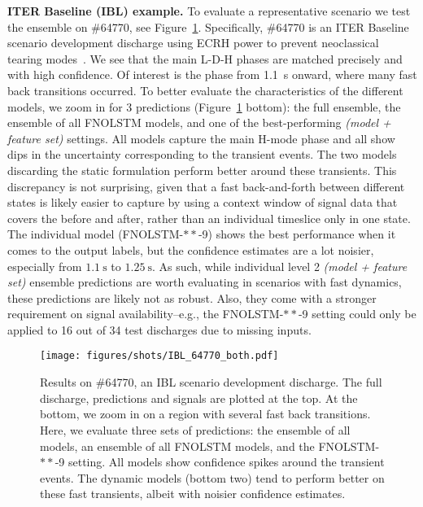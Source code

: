 \textbf{ITER Baseline (IBL) example.} To evaluate a representative scenario we test the ensemble on \#64770, see Figure~\ref{fig:s_ibl}. Specifically, \#64770 is an ITER Baseline scenario development discharge using ECRH power to prevent neoclassical tearing modes~\cite{labit2024}. We see that the main L-D-H phases are matched precisely and with high confidence. Of interest is the phase from \SI{1.1}{\second} onward, where many fast back transitions occurred. To better evaluate the characteristics of the different models, we zoom in for 3 predictions (Figure~\ref{fig:s_ibl} bottom): the full ensemble, the ensemble of all FNOLSTM models, and one of the best-performing \textit{(model + feature set)} settings. All models capture the main H-mode phase and all show dips in the uncertainty corresponding to the transient events. The two models discarding the static formulation perform better around these transients. This discrepancy is not surprising, given that a fast back-and-forth between different states is likely easier to capture by using a context window of signal data that covers the before and after, rather than an individual timeslice only in one state. The individual model (FNOLSTM-$\ast\ast$-9) shows the best performance when it comes to the output labels, but the confidence estimates are a lot noisier, especially from $\SI{1.1}{\second}$ to $\SI{1.25}{\second}$. As such, while individual level 2 \textit{(model + feature set)} ensemble predictions are worth evaluating in scenarios with fast dynamics, these predictions are likely not as robust. Also, they come with a stronger requirement on signal availability--e.g., the FNOLSTM-$\ast\ast$-9 setting could only be applied to 16 out of 34 test discharges due to missing inputs.
\begin{figure}[t]
\begin{center}\texttt{[image: figures/shots/IBL\_64770\_both.pdf]}\end{center}
    \caption{Results on \#64770, an IBL scenario development discharge. The full discharge, predictions and signals are plotted at the top. At the bottom, we zoom in on a region with several fast back transitions. Here, we evaluate three sets of predictions: the ensemble of all models, an ensemble of all FNOLSTM models, and the FNOLSTM-$\ast\ast$-9 setting. All models show confidence spikes around the transient events. The dynamic models (bottom two) tend to perform better on these fast transients, albeit with noisier confidence estimates.}
    \label{fig:s_ibl}%
\end{figure}

